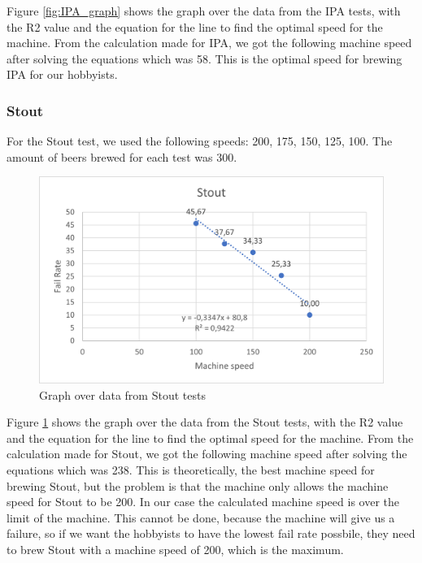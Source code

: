 Figure \ref{fig:IPA_graph} shows the graph over the data from the IPA tests, with the R2 value and the equation for the line to find the optimal speed for the machine. \newline
From the calculation made for IPA, we got the following machine speed after solving the equations which was 58. This is the optimal speed for brewing IPA for our hobbyists. \newline

\subsubsection{Stout}
For the Stout test, we used the following speeds: 200, 175, 150, 125, 100. The amount of beers brewed for each test was 300.

\begin{center}
    \centering
    \begin{figure}[H]
        \includegraphics[width=1\textwidth]{img/Stout_graph.png}
        \caption{Graph over data from Stout tests}
        \label{fig:Stout_graph}
    \end{figure}
\end{center}

Figure \ref{fig:Stout_graph} shows the graph over the data from the Stout tests, with the R2 value and the equation for the line to find the optimal speed for the machine. \newline
From the calculation made for Stout, we got the following machine speed after solving the equations which was 238. This is theoretically, the best machine speed for brewing Stout, but the problem is that the machine only allows the machine speed for Stout to be 200.
In our case the calculated machine speed is over the limit of the machine. This cannot be done, because the machine will give us a failure, so if we want the hobbyists to have the lowest fail rate possbile, they need to brew Stout with a machine speed of 200, which is the maximum. \newline

